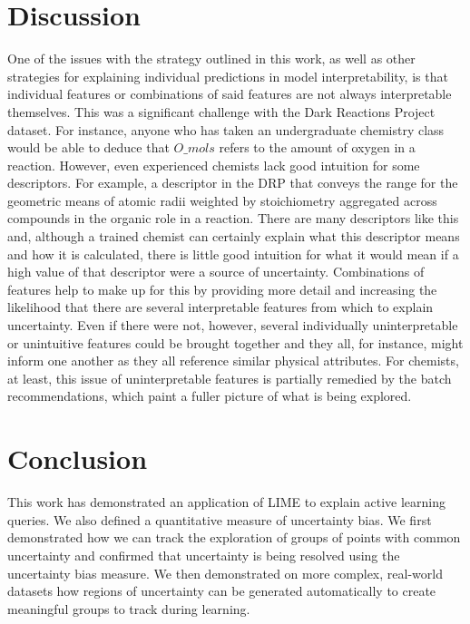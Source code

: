 \section{Discussion}
One of the issues with the strategy outlined in this work, as well as other strategies for explaining individual predictions in model interpretability, is that individual features or combinations of said features are not always interpretable themselves. This was a significant challenge with the Dark Reactions Project dataset. For instance, anyone who has taken an undergraduate chemistry class would be able to deduce that $O\_mols$ refers to the amount of oxygen in a reaction. However, even experienced chemists lack good intuition for some descriptors. For example, a descriptor in the DRP that conveys the range for the geometric means of atomic radii weighted by stoichiometry aggregated across compounds in the organic role in a reaction. There are many descriptors like this and, although a trained chemist can certainly explain what this descriptor means and how it is calculated, there is little good intuition for what it would mean if a high value of that descriptor were a source of uncertainty. Combinations of features help to make up for this by providing more detail and increasing the likelihood that there are several interpretable features from which to explain uncertainty. Even if there were not, however, several individually uninterpretable or unintuitive features could be brought together and they all, for instance, might inform one another as they all reference similar physical attributes. For chemists, at least, this issue of uninterpretable features is partially remedied by the batch recommendations, which paint a fuller picture of what is being explored. 

\section{Conclusion}
This work has demonstrated an application of LIME to explain active learning queries. We also defined a quantitative measure of uncertainty bias. We first demonstrated how we can track the exploration of groups of points with common uncertainty and confirmed that uncertainty is being resolved using the uncertainty bias measure. We then demonstrated on more complex, real-world datasets how regions of uncertainty can be generated automatically to create meaningful groups to track during learning. %